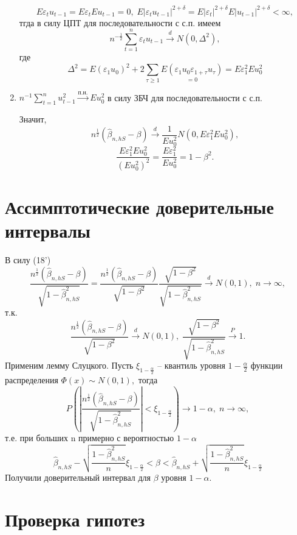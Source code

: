 \begin{Proof}
\begin{enumerate}
        $$E\varepsilon_t u_{t - 1} = E\varepsilon_t Eu_{t - 1} = 0, \; E|\varepsilon_t u_{t - 1}|^{2 + \delta} = E|\varepsilon_t|^{2 + \delta}E|u_{t - 1}|^{2 + \delta} < \infty,$$
        тгда в силу ЦПТ для последовательности с с.п. имеем
        $$n^{-\frac{1}{2}}\sum\limits_{t = 1}^n \varepsilon_t u_{t - 1} \stackrel{d}{\rightarrow} N(0, \Delta^2),$$
        где 
        $$\Delta^2 = E(\varepsilon_1 u_0)^2 + 2\sum\limits_{\tau \geq 1} \underset{=0}{E(\varepsilon_1 u_0 \varepsilon_{1 + \tau} u_{\tau})} = E\varepsilon_1^2 Eu_0^2$$
        \item $n^{-1}\sum\limits_{t = 1}^n u_{t - 1}^2 \stackrel{\text{п.н.}}{\rightarrow} Eu_0^2$ в силу ЗБЧ для последовательности с с.п.

        Значит, 
        $$n^{\frac{1}{2}}(\hat{\beta}_{n, hS} - \beta) \stackrel{d}{\rightarrow} \dfrac{1}{Eu_0^2}N(0, E\varepsilon_1^2 Eu_0^2),$$
        $$\dfrac{E\varepsilon_1^2 Eu_0^2}{(Eu_0^2)^2} = \dfrac{E\varepsilon_1^2}{Eu_0^2} = 1 - \beta^2.$$
    \end{enumerate}
\end{Proof}

\section{Ассимптотические доверительные интервалы}\label{lec:13/sec:3}
В силу (18')
$$\dfrac{n^{\frac{1}{2}}(\hat{\beta}_{n, hS} - \beta)}{\sqrt{1 - \hat{\beta}_{n, hS}^2}} = \dfrac{n^{\frac{1}{2}}(\hat{\beta}_{n, hS} - \beta)}{\sqrt{1 - \beta^2}}\dfrac{\sqrt{1 - \beta^2}}{\sqrt{1 - \hat{\beta}_{n, hS}^2}} \stackrel{d}{\rightarrow} N(0, 1), \; n \to \infty,$$
т.к.
$$\dfrac{n^{\frac{1}{2}}(\hat{\beta}_{n, hS} - \beta)}{\sqrt{1 - \beta^2}} \stackrel{d}{\rightarrow} N(0, 1), \; \dfrac{\sqrt{1 - \beta^2}}{\sqrt{1 - \hat{\beta}_{n, hS}^2}} \stackrel{P}{\rightarrow} 1.$$
Применим лемму Слуцкого. Пусть $\xi_{1 - \frac{\alpha}{2}}$ -- квантиль уровня $1 - \frac{\alpha}{2}$ функции распределения $\Phi(x) \sim N(0, 1),$ тогда
$$P(|\dfrac{n^{\frac{1}{2}}(\hat{\beta}_{n, hS} - \beta)}{\sqrt{1 - \hat{\beta}_{n, hS}^2}}| < \xi_{1 - \frac{\alpha}{2}}) \to 1 - \alpha, \; n \to \infty,$$
т.е. при больших n примерно с вероятностью $1 - \alpha$
$$\hat{\beta}_{n, hS} - \sqrt{\dfrac{1 - \hat{\beta}_{n, hS}^2}{n}} \xi_{1 - \frac{\alpha}{2}} < \beta < \hat{\beta}_{n, hS} + \sqrt{\dfrac{1 - \hat{\beta}_{n, hS}^2}{n}} \xi_{1 - \frac{\alpha}{2}}$$
Получили доверительный интервал для $\beta$ уровня $1 - \alpha.$

\section{Проверка гипотез}\label{lec:13/sec:4}

